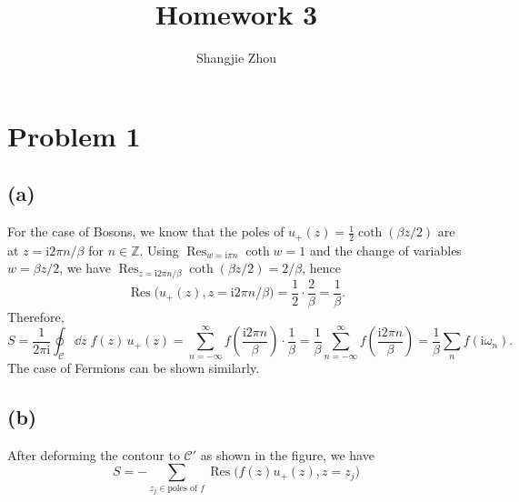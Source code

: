 \documentclass{article}
\title{Homework 3}
\author{Shangjie Zhou}
\newcommand{\ii}{\mathrm{i}}
\begin{document}
\maketitle


\section*{Problem 1}
\subsection*{(a)}
For the case of Bosons, we know that the poles of $u_+(z)=\tfrac{1}{2}\coth(\beta z/2)$ are at $z=\ii 2\pi n/\beta$ for $n\in \mathbb{Z}$. Using $\operatorname*{Res}_{w=\ii\pi n}\coth w=1$ and the change of variables $w=\beta z/2$, we have $\operatorname*{Res}_{z=\ii 2\pi n/\beta}\coth(\beta z/2)=2/\beta$, hence
\begin{equation}
    \operatorname*{Res}\big(u_+(z), z=\ii 2\pi n/\beta\big) = \frac{1}{2}\cdot\frac{2}{\beta} = \frac{1}{\beta}.
\end{equation}
Therefore,
\begin{equation}
    S=\frac{1}{2\pi\ii}\oint_\mathcal{C}\dd{z}\; f(z)\,u_+(z)=\sum_{n=-\infty}^{\infty} f\!\left(\frac{\ii 2\pi n}{\beta}\right)\cdot \frac{1}{\beta} = \frac{1}{\beta}\sum_{n=-\infty}^{\infty} f\!\left(\frac{\ii 2\pi n}{\beta}\right)=\frac{1}{\beta}\sum_n f(\ii\omega_n).
\end{equation}
The case of Fermions can be shown similarly.

\subsection*{(b)}
After deforming the contour to $\mathcal{C}'$ as shown in the figure, we have
\begin{equation}
    S=-\sum_{z_j\in\text{poles of }f}\operatorname*{Res}\big(f(z)u_+(z), z=z_j\big)
\end{equation}
\end{document}
